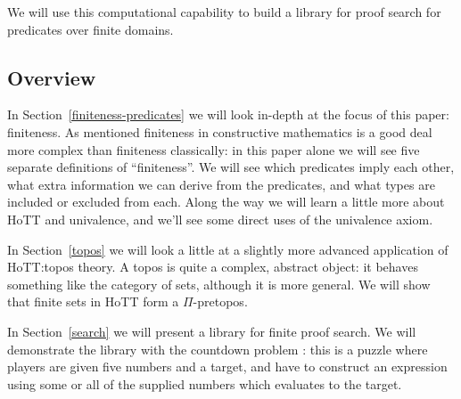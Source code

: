 We will use this computational capability to build a library for proof search
for predicates over finite domains.

\subsection{Overview}
In Section~\ref{finiteness-predicates} we will look in-depth at the focus of
this paper: finiteness.
As mentioned finiteness in constructive mathematics is a good deal more complex
than finiteness classically:
in this paper alone we will see five separate definitions of ``finiteness''.
We will see which predicates imply each other, what extra information we can
derive from the predicates, and what types are included or excluded from each.
Along the way we will learn a little more about HoTT and univalence, and we'll
see some direct uses of the univalence axiom.

In Section~\ref{topos} we will look a little at a slightly more advanced
application of HoTT:\@ topos theory.
A topos is quite a complex, abstract object: it behaves something like the
category of sets, although it is more general.
We will show that finite sets in HoTT form a $\Pi$-pretopos.

In Section~\ref{search} we will present a library for finite proof search.
We will demonstrate the library with the countdown problem
\citep{huttonCountdownProblem2002}: this is a puzzle where
players are given five numbers and a target, and have to construct an expression
using some or all of the supplied numbers which evaluates to the target.

